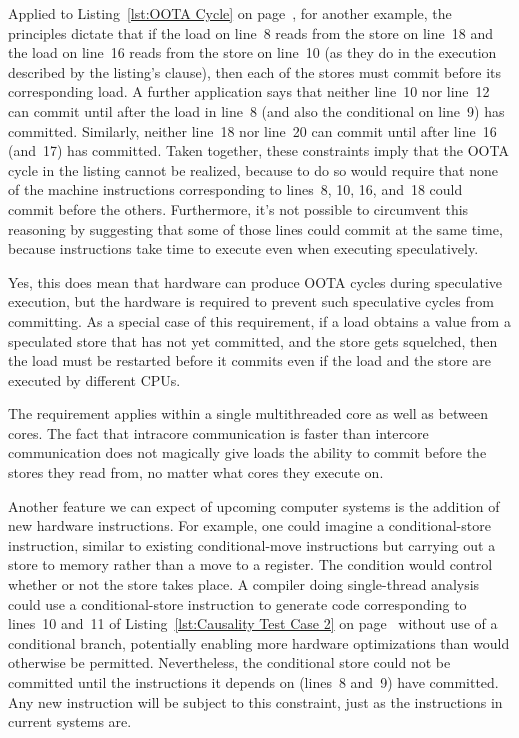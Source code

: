\documentclass[10]{article}
\begin{document}
Applied to Listing~\ref{lst:OOTA Cycle} on
page~\pageref{lst:OOTA Cycle}, for another example,
the principles dictate that if the load on line~8 reads from the store
on line~18 and the load on line~16 reads from the store on line~10
(as they do in the execution described by the listing's  clause),
then each of the stores must commit before its corresponding load.
A further application says that
neither line~10 nor line~12 can commit until after the load
in line~8 (and also the conditional on line~9) has committed.
Similarly, neither line~18 nor line~20 can commit until after line~16
(and~17) has committed.
Taken together, these constraints imply that the OOTA cycle in the
listing cannot be realized, because to do so would require that
none of the machine instructions corresponding to lines~8, 10, 16,
and~18 could commit before the others.
Furthermore, it's not possible to circumvent this reasoning by suggesting
that some of those lines could commit at the same time,
because instructions take time to execute even when executing
speculatively.

Yes, this does mean that hardware can produce OOTA cycles during
speculative execution, but the hardware is required to prevent such
speculative cycles from committing.
As a special case of this requirement, if a load obtains
a value from a speculated store that has not yet committed,
and the store gets squelched,
then the load must be restarted before it commits even if the load and
the store are executed by different CPUs.

The requirement applies within a single
multithreaded core as well as between cores.
The fact that intracore communication is faster than intercore
communication does not magically give loads the ability to commit
before the stores they read from, no matter what cores they execute on.

\medskip

Another feature we can expect of upcoming computer systems is the
addition of new hardware instructions.
For example, one could imagine a conditional-store instruction,
similar to existing conditional-move instructions but carrying out
a store to memory rather than a move to a register.
The condition would control whether or not the store takes place.
A compiler doing single-thread analysis could use a conditional-store
instruction to generate code corresponding to lines~10 and~11 of
Listing~\ref{lst:Causality Test Case 2}
on page~\pageref{lst:Causality Test Case 2}
without use of a conditional branch, potentially
enabling more hardware optimizations than would otherwise be permitted.
Nevertheless, the conditional store could not be committed until
the instructions it depends on (lines~8 and~9) have committed.
Any new instruction will be subject to this constraint,
just as the instructions in current systems are.
\end{document}
